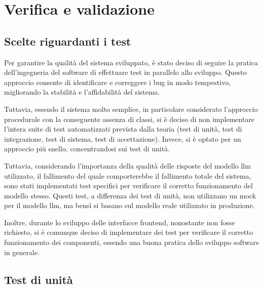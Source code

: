 \chapter{Verifica e validazione}
\label{cap:verifica-validazione}



\section{Scelte riguardanti i test}

Per garantire la qualità del sistema sviluppato, è stato deciso di seguire la pratica dell'ingegneria del software di effettuare test in parallelo allo sviluppo. Questo approccio consente di identificare e correggere i bug in modo tempestivo, migliorando la stabilità e l'affidabilità del sistema.

Tuttavia, essendo il sistema molto semplice, in particolare considerato l'approccio procedurale con la conseguente assenza di classi, si è deciso di non implementare l'intera suite di test automatizzati prevista dalla teoria (test di unità, test di integrazione, test di sistema, test di accettazione). Invece, si è optato per un approccio più snello, concentrandosi sui test di unità.

Tuttavia, considerando l'importanza della qualità delle risposte del modello \gls{llm} utilizzato, il fallimento del quale comporterebbe il fallimento totale del sistema, sono stati implementati test specifici per verificare il corretto funzionamento del modello stesso. Questi test, a differenza dei test di unità, non utilizzano un mock per il modello \gls{llm}, ma bensì si basano sul modello reale utilizzato in produzione.

Inoltre, durante lo sviluppo delle interfacce frontend, nonostante non fosse richiesto, si è comunque deciso di implementare dei test per verificare il corretto funzionamento dei componenti, essendo una buona pratica dello sviluppo software in generale.


\section{Test di unità}

